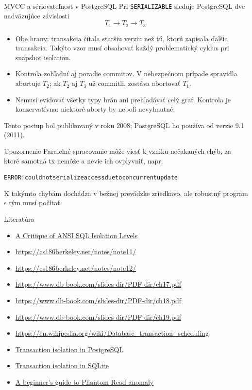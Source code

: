\documentclass[12pt]{beamer}
\begin{document}
\begin{frame}[fragile]{MVCC a sériovateľnosť v PostgreSQL}
Pri \verb|SERIALIZABLE| sleduje PostgreSQL dve nadväzujúce závislosti
\[
T_1\longrightarrow T_2\longrightarrow T_3.
\]
\begin{itemize}
\item Obe hrany: transakcia čítala staršiu verziu než tú, ktorú zapísala ďalšia transakcia.
Takýto vzor musí obsahovať každý problematický cyklus pri snapshot isolation.
\item Kontrola zohľadní aj poradie commitov. V nebezpečnom prípade spravidla abortuje $T_2$;
ak $T_2$ aj $T_3$ už commitli, zostáva abortovať $T_1$.
\item Nemusí evidovať všetky typy hrán ani prehľadávať celý graf.
Kontrola je konzervatívna: niektoré aborty by neboli nevyhnutné.
\end{itemize}
Tento postup bol publikovaný v roku 2008; PostgreSQL ho používa od verzie 9.1 (2011).
\end{frame}

\begin{frame}[fragile]{Upozornenie}
Paralelné spracovanie môže viesť k vzniku \alert{nečakaných chýb}, za ktoré samotná tx nemôže a nevie ich ovplyvniť, napr.
{\scriptsize
\begin{alltt}
    ERROR:  could not serialize access due to concurrent update
\end{alltt}
}
K takýmto chybám dochádza v bežnej prevádzke zriedkavo, ale robustný program s tým musí počítať.
\end{frame}


\begin{frame}{Literatúra}
\begin{itemize}
\item {\scriptsize\href{https://arxiv.org/abs/cs/0701157}{A Critique of ANSI SQL Isolation Levels}}
\item {\scriptsize\url{https://cs186berkeley.net/notes/note11/}}
\item {\scriptsize\url{https://cs186berkeley.net/notes/note12/}}
\item {\scriptsize\url{https://www.db-book.com/slides-dir/PDF-dir/ch17.pdf}}
\item {\scriptsize\url{https://www.db-book.com/slides-dir/PDF-dir/ch18.pdf}}
\item {\scriptsize\url{https://www.db-book.com/slides-dir/PDF-dir/ch19.pdf}}
\item {\scriptsize\url{https://en.wikipedia.org/wiki/Database_transaction_scheduling}}
\item {\scriptsize\href{https://www.postgresql.org/docs/current/mvcc.html}{Transaction isolation in PostgreSQL}}
\item {\scriptsize\href{https://www.sqlite.org/isolation.html}{Transaction isolation in SQLite}}
\item {\scriptsize\href{https://tinyurl.com/nhk9659m}{A beginner’s guide to Phantom Read anomaly}}
\end{itemize}
\end{frame}
\end{document}
